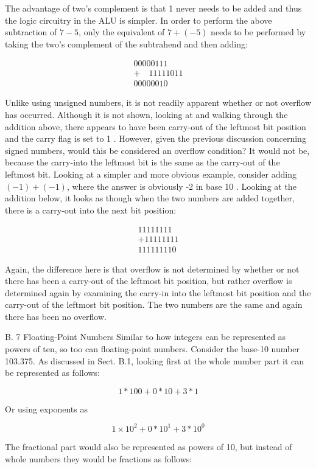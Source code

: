 \documentclass[10pt]{book}
\begin{document}
The advantage of two's complement is that 1 never needs to be added and thus the logic circuitry in the ALU is simpler. In order to perform the above subtraction of $7-5$, only the equivalent of $7+(-5)$ needs to be performed by taking the two's complement of the subtrahend and then adding:

$$
\begin{array}{r}
00000111 \\
+\quad 11111011 \\
\hline 00000010
\end{array}
$$

Unlike using unsigned numbers, it is not readily apparent whether or not overflow has occurred. Although it is not shown, looking at and walking through the addition above, there appears to have been carry-out of the leftmost bit position and the carry flag is set to 1 . However, given the previous discussion concerning signed numbers, would this be considered an overflow condition? It would not be, because the carry-into the leftmost bit is the same as the carry-out of the leftmost bit. Looking at a simpler and more obvious example, consider adding $(-1)+(-1)$, where the answer is obviously -2 in base 10 . Looking at the addition below, it looks as though when the two numbers are added together, there is a carry-out into the next bit position:

$$
\begin{array}{r}
11111111 \\
+11111111 \\
\hline 111111110
\end{array}
$$

Again, the difference here is that overflow is not determined by whether or not there has been a carry-out of the leftmost bit position, but rather overflow is determined again by examining the carry-in into the leftmost bit position and the carry-out of the leftmost bit position. The two numbers are the same and again there has been no overflow.

B. 7 Floating-Point Numbers
Similar to how integers can be represented as powers of ten, so too can floating-point numbers. Consider the base-10 number 103.375. As discussed in Sect. B.1, looking first at the whole number part it can be represented as follows:

$$
1 * 100+0 * 10+3 * 1
$$

Or using exponents as

$$
1 \times 10^{2}+0 * 10^{1}+3 * 10^{0}
$$

The fractional part would also be represented as powers of 10, but instead of whole numbers they would be fractions as follows:
\end{document}
